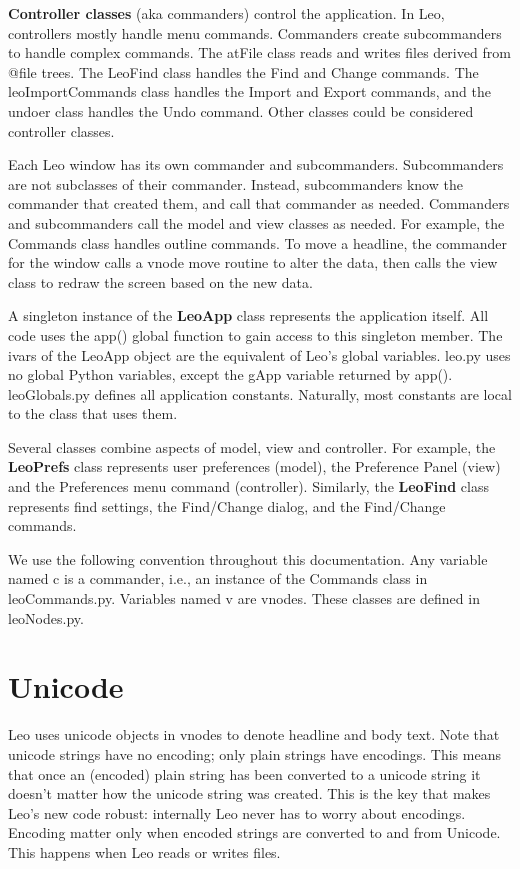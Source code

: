 \documentclass[a4paper,10pt,english]{sphinxmanual}
\begin{document}
\textbf{Controller classes} (aka commanders) control the application. In Leo,
controllers mostly handle menu commands. Commanders create subcommanders to
handle complex commands. The atFile class reads and writes files derived from
@file trees. The LeoFind class handles the Find and Change commands. The
leoImportCommands class handles the Import and Export commands, and the undoer
class handles the Undo command. Other classes could be considered controller
classes.

Each Leo window has its own commander and subcommanders. Subcommanders are not
subclasses of their commander. Instead, subcommanders know the commander that
created them, and call that commander as needed. Commanders and subcommanders
call the model and view classes as needed. For example, the Commands class
handles outline commands. To move a headline, the commander for the window calls
a vnode move routine to alter the data, then calls the view class to redraw the
screen based on the new data.

A singleton instance of the \textbf{LeoApp} class represents the application itself.
All code uses the app() global function to gain access to this singleton member.
The ivars of the LeoApp object are the equivalent of Leo's global variables.
leo.py uses no global Python variables, except the gApp variable returned by
app(). leoGlobals.py defines all application constants. Naturally, most
constants are local to the class that uses them.

Several classes combine aspects of model, view and controller. For example, the
\textbf{LeoPrefs} class represents user preferences (model), the Preference Panel
(view) and the Preferences menu command (controller). Similarly, the \textbf{LeoFind}
class represents find settings, the Find/Change dialog, and the Find/Change
commands.

We use the following convention throughout this documentation. Any variable
named c is a commander, i.e., an instance of the Commands class in
leoCommands.py. Variables named v are vnodes. These classes are defined in
leoNodes.py.


\section{Unicode}
\label{theory:unicode}
Leo uses unicode objects in vnodes to denote headline and body text.
Note that unicode strings have no encoding; only plain strings have encodings.
This means that once an (encoded) plain string has been converted to a unicode
string it doesn't matter how the unicode string was created. This is the key
that makes Leo's new code robust: internally Leo never has to worry about
encodings. Encoding matter only when encoded strings are converted to and from
Unicode. This happens when Leo reads or writes files.
\end{document}
